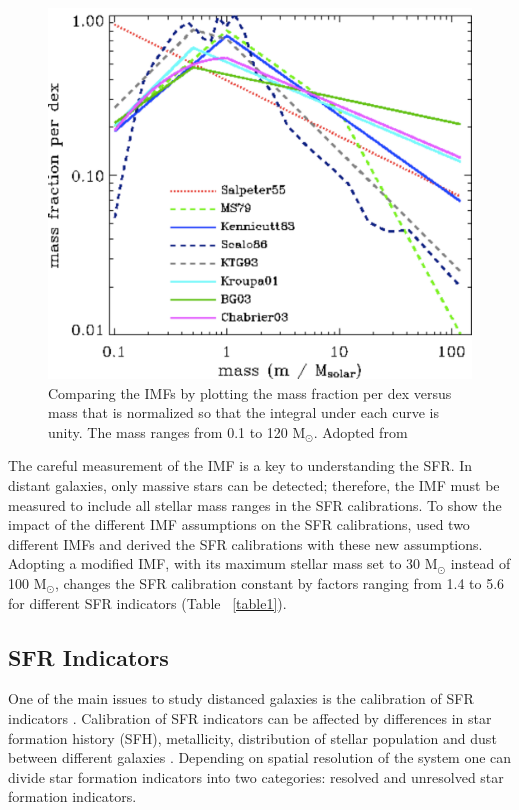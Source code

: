 \begin{figure}[h]
\label{fig: imf}
\centering
\includegraphics[width=16cm]{../image_intro/imf}
\small
\caption{Comparing the IMFs by plotting the mass fraction per dex versus mass that is normalized so that the integral under each curve is unity. The mass ranges from 0.1 to 120 M$_\odot$. Adopted from \cite{Baldry03}}
\end{figure}


The careful measurement of the IMF is a key to understanding the SFR. In distant galaxies, only massive stars can be detected; therefore, the IMF must be measured to include all stellar mass ranges in the SFR calibrations. To show the impact of the different IMF assumptions on the SFR calibrations, \cite{Calzetti13} used two different IMFs and derived the SFR calibrations with these new assumptions. Adopting a modified \cite{Kroupa01} IMF, with its maximum stellar mass set to 30 M$_{\odot}$ instead of 100 M$_{\odot}$, changes the SFR calibration constant by factors ranging from 1.4 to 5.6 for different SFR indicators (Table {~\ref{table1}}).  

\subsection{SFR Indicators}

One of the main issues to study distanced galaxies is the calibration of SFR indicators \citep[e.g.,][]{Lee10}. Calibration of SFR indicators can be affected by differences in star formation history (SFH), metallicity, distribution of stellar population and dust between different galaxies \citep{Calzetti13}. Depending on spatial resolution of the system one can divide star formation indicators into two categories: resolved and unresolved star formation indicators.

